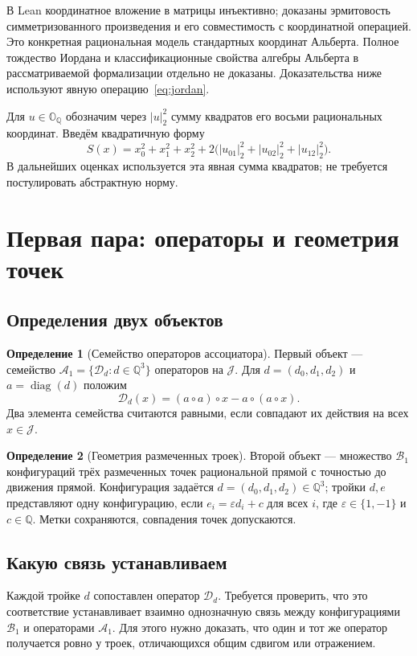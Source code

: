 \documentclass[11pt,a4paper]{article}
\numberwithin{equation}{section}
\theoremstyle{definition}
\newtheorem{definition}{Определение}
\theoremstyle{remark}
\newcommand{\QQ}{\mathbb{Q}}
\newcommand{\OO}{\mathbb{O}_{\QQ}}
\newcommand{\J}{\mathcal{J}}
\newcommand{\D}{\mathcal{D}}
\newcommand{\diag}{\operatorname{diag}}
\begin{document}
В Lean координатное вложение в матрицы инъективно; доказаны эрмитовость
симметризованного произведения и его совместимость с координатной
операцией. Это конкретная рациональная модель стандартных координат
Альберта. Полное тождество Иордана и классификационные свойства
алгебры Альберта в рассматриваемой формализации отдельно не доказаны.
Доказательства ниже используют явную операцию~\eqref{eq:jordan}.

Для $u\in\OO$ обозначим через $|u|_2^2$ сумму квадратов его восьми
рациональных координат. Введём квадратичную форму
\begin{equation}\label{eq:size}
 S(x)=x_0^2+x_1^2+x_2^2+
 2\bigl(|u_{01}|_2^2+|u_{02}|_2^2+|u_{12}|_2^2\bigr).
\end{equation}
В дальнейших оценках используется эта явная сумма квадратов;
не требуется постулировать абстрактную норму.

\section{Первая пара: операторы и геометрия точек}\label{sec:geometry}
\subsection{Определения двух объектов}
\begin{definition}[Семейство операторов ассоциатора]\label{def:operators}
Первый объект --- семейство $\mathcal A_1=\{\D_d:d\in\QQ^3\}$
операторов на $\J$. Для $d=(d_0,d_1,d_2)$ и $a=\diag(d)$ положим
\begin{equation}\label{eq:defect}
 \D_d(x)=(a\circ a)\circ x-a\circ(a\circ x).
\end{equation}
Два элемента семейства считаются равными, если совпадают их действия
на всех $x\in\J$.
\end{definition}

\begin{definition}[Геометрия размеченных троек]\label{def:points}
Второй объект --- множество $\mathcal B_1$ конфигураций трёх
размеченных точек рациональной прямой с точностью до движения прямой.
Конфигурация задаётся $d=(d_0,d_1,d_2)\in\QQ^3$; тройки $d,e$
представляют одну конфигурацию, если
$e_i=\varepsilon d_i+c$ для всех $i$, где
$\varepsilon\in\{1,-1\}$ и $c\in\QQ$.
Метки сохраняются, совпадения точек допускаются.
\end{definition}

\subsection{Какую связь устанавливаем}
Каждой тройке $d$ сопоставлен оператор $\D_d$. Требуется проверить,
что это соответствие устанавливает взаимно однозначную связь
между конфигурациями $\mathcal B_1$ и операторами $\mathcal A_1$.
Для этого нужно доказать, что один и тот же оператор получается
ровно у троек, отличающихся общим сдвигом или отражением.
\end{document}
